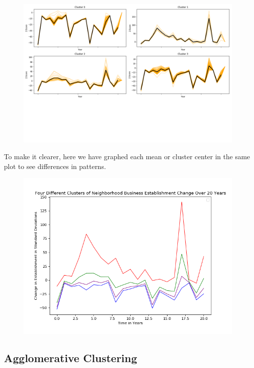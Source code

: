 \documentclass[letter, 11pt]{article} %
\begin{document}
		\begin{figure}[H]
			\centering
			\vspace{5pt}
			\includegraphics[scale=.25]{clusters.png}
		\end{figure}
		
		\noindent To make it clearer, here we have graphed each mean or cluster center in the same plot to see differences in patterns.
		
		\begin{figure}[H]
			\centering
			\includegraphics[scale=.5]{means1.png}
		\end{figure}
		
		\pagebreak
	

	
	\subsection{Agglomerative Clustering}
	
\end{document}

